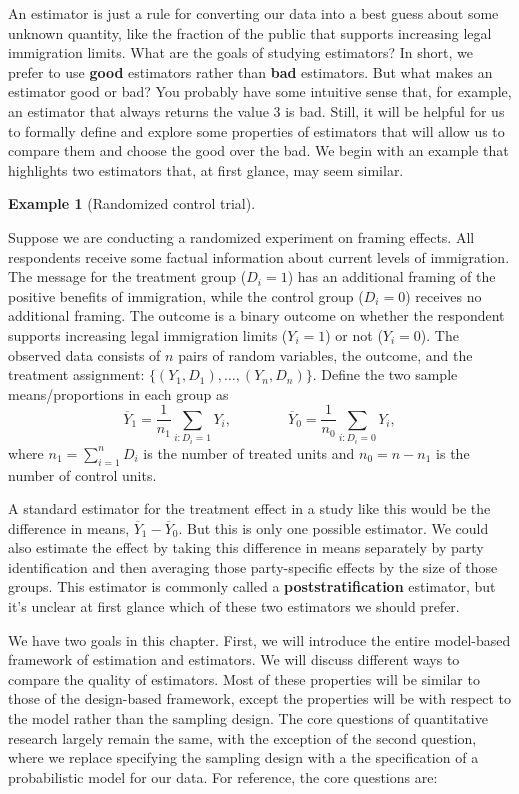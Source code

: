 \documentclass[
  letterpaper,
  DIV=11,
  numbers=noendperiod]{scrreprt}
\newcommand{\Ybar}{\overline{Y}}
\theoremstyle{definition}
\newtheorem{example}{Example}[chapter]
\theoremstyle{definition}
\theoremstyle{plain}
\theoremstyle{remark}
\begin{document}
An estimator is just a rule for converting our data into a best guess
about some unknown quantity, like the fraction of the public that
supports increasing legal immigration limits. What are the goals of
studying estimators? In short, we prefer to use \textbf{good} estimators
rather than \textbf{bad} estimators. But what makes an estimator good or
bad? You probably have some intuitive sense that, for example, an
estimator that always returns the value 3 is bad. Still, it will be
helpful for us to formally define and explore some properties of
estimators that will allow us to compare them and choose the good over
the bad. We begin with an example that highlights two estimators that,
at first glance, may seem similar.

\begin{example}[Randomized control
trial]\protect\hypertarget{exm-rct}{}\label{exm-rct}

Suppose we are conducting a randomized experiment on framing effects.
All respondents receive some factual information about current levels of
immigration. The message for the treatment group (\(D_i = 1\)) has an
additional framing of the positive benefits of immigration, while the
control group (\(D_i = 0\)) receives no additional framing. The outcome
is a binary outcome on whether the respondent supports increasing legal
immigration limits (\(Y_i = 1\)) or not (\(Y_i = 0\)). The observed data
consists of \(n\) pairs of random variables, the outcome, and the
treatment assignment: \(\{(Y_1, D_1), \ldots, (Y_n, D_n)\}\). Define the
two sample means/proportions in each group as \[
\Ybar_1 = \frac{1}{n_1} \sum_{i: D_i = 1} Y_i, \qquad\qquad \Ybar_0 = \frac{1}{n_0} \sum_{i: D_i = 0} Y_i,
\] where \(n_1 = \sum_{i=1}^n D_i\) is the number of treated units and
\(n_0 = n - n_1\) is the number of control units.

A standard estimator for the treatment effect in a study like this would
be the difference in means, \(\Ybar_1 - \Ybar_0\). But this is only one
possible estimator. We could also estimate the effect by taking this
difference in means separately by party identification and then
averaging those party-specific effects by the size of those groups. This
estimator is commonly called a \textbf{poststratification} estimator,
but it's unclear at first glance which of these two estimators we should
prefer.

\end{example}

We have two goals in this chapter. First, we will introduce the entire
model-based framework of estimation and estimators. We will discuss
different ways to compare the quality of estimators. Most of these
properties will be similar to those of the design-based framework,
except the properties will be with respect to the model rather than the
sampling design. The core questions of quantitative research largely
remain the same, with the exception of the second question, where we
replace specifying the sampling design with a the specification of a
probabilistic model for our data. For reference, the core questions are:
\end{document}
